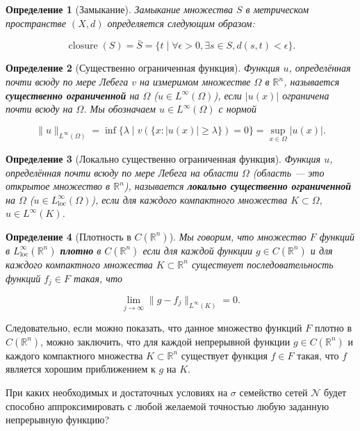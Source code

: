 \documentclass[12pt]{article}
\newtheorem{definition}{Определение}
\begin{document}
	\begin{definition}[Замыкание]
		Замыкание множества $S$ в метрическом пространстве $(X, d)$ определяется следующим образом:
		
		\[
		\operatorname{closure}(S) = \bar{S} = \{ t \mid \forall \epsilon > 0, \exists s \in S, d(s, t) < \epsilon \}.
		\]
	\end{definition}
	
	\begin{definition}[Существенно ограниченная функция]
		Функция $u$, определённая почти всюду по мере Лебега $v$ на измеримом множестве $\Omega$ в $\mathbb{R}^n$, называется \textbf{существенно ограниченной} на $\Omega$ ($u \in L^\infty(\Omega)$), если $|u(x)|$ ограничена почти всюду на $\Omega$. Мы обозначаем $u \in L^\infty(\Omega)$ с нормой
		
		\[
		\|u\|_{L^\infty(\Omega)} = \inf\{ \lambda \mid v(\{ x : |u(x)| \geq \lambda \}) = 0 \} = \sup_{x \in \Omega} |u(x)|.
		\]
	\end{definition}
	
	\begin{definition}[Локально существенно ограниченная функция]
		Функция $u$, определённая почти всюду по мере Лебега на области $\Omega$ (область — это открытое множество в $\mathbb{R}^n$), называется \textbf{локально существенно ограниченной} на $\Omega$ ($u \in L^\infty_{\text{loc}}(\Omega)$), если для каждого компактного множества $K \subset \Omega$, $u \in L^\infty(K)$.
	\end{definition}
	
	\begin{definition}[Плотность в $C(\mathbb{R}^n)$]
		Мы говорим, что множество $F$ функций в $L^\infty_{\text{loc}}(\mathbb{R}^n)$ \textbf{плотно} в $C(\mathbb{R}^n)$ если для каждой функции $g \in C(\mathbb{R}^n)$ и для каждого компактного множества $K \subset \mathbb{R}^n$ существует последовательность функций $f_j \in F$ такая, что
		
		\[
		\lim_{j \to \infty} \| g - f_j \|_{L^\infty(K)} = 0.
		\]
		
	\end{definition}
	
	Следовательно, если можно показать, что данное множество функций $F$ плотно в $C(\mathbb{R}^n)$, можно заключить, что для каждой непрерывной функции $g \in C(\mathbb{R}^n)$ и каждого компактного множества $K \subset \mathbb{R}^n$ существует функция $f \in F$ такая, что $f$ является хорошим приближением к $g$ на $K$. 
	
	При каких необходимых и достаточных условиях на $\sigma$ семейство сетей $\mathcal{N}$ будет способно аппроксимировать с любой желаемой точностью любую заданную непрерывную функцию?
	
\end{document}
